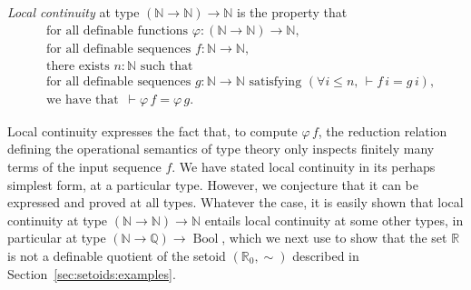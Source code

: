 \documentclass[envcountsame]{llncs}
\newcommand{\N}{\mathbb{N}}
\newcommand{\Q}{\mathbb{Q}}
\newcommand{\R}{\mathbb{R}}
\DeclareMathOperator{\Bool}{Bool}
\newcommand{\fad}{\text{for all definable }}
\begin{document}
\begin{definition}\label{def:localcontinuity}
\emph{Local continuity} at type $(\N \to \N) \to \N$ is the property that
\begin{align*}
   &\fad\text{functions }\varphi : (\N \to \N) \to \N,\\
   &\fad\text{sequences }f : \N \to \N,\\
   &\text{there exists }  n:\N\text{ such that }\\
   &\fad\text{sequences } g : \N \to \N \text{ satisfying } (\forall i\leq n,\, \vdash f\,i = g\,i),\\
   &\text{we have that }{\,\vdash \varphi\, f} = \varphi\, g.
\end{align*}
\end{definition}
Local continuity expresses the fact that, to compute $\varphi\,f$, the reduction relation defining the operational semantics of type theory only inspects finitely many terms of the input sequence $f$. We have stated local continuity in its perhaps simplest form, at a particular type. However, we conjecture that it can be expressed and proved at all types. Whatever the case, it is easily shown that local continuity at type $(\N\to\N)\to\N$  entails local continuity at some other types, in particular at type $(\N\to\Q)\to\Bool$, which we next use to show that the set $\R$ is not a definable quotient of the setoid $(\R_0,\sim)$ described in Section~\ref{sec:setoids:examples}.
\end{document}
